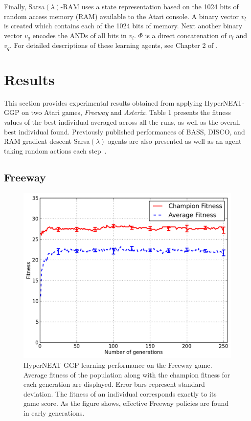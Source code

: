 \documentclass{sig-alternate}
\begin{document}
Finally, Sarsa$(\lambda)$-RAM uses a state representation based on the 1024 bits of random access memory (RAM) available to the Atari console. A binary vector $v_l$ is created which contains each of the 1024 bits of memory. Next another binary vector $v_q$ encodes the ANDs of all bits in $v_l$. $\Phi$ is a direct concatenation of $v_l$ and $v_q$. For detailed descriptions of these learning agents, see Chapter 2 of \cite{naddaf10}.

\section{Results}
\label{sec:results}
This section provides experimental results obtained from applying HyperNEAT-GGP on two Atari games, \textit{Freeway} and \textit{Asterix}. Table 1 presents the fitness values of the best individual averaged across all the runs, as well as the overall best individual found. Previously published performances of BASS, DISCO, and RAM gradient descent Sarsa$(\lambda)$ agents are also presented as well as an agent taking random actions each step~\cite{naddaf10}. 

\subsection {Freeway}

\begin{figure}[ht]
\begin{center}
\includegraphics[width=\columnwidth]{figures/freeway-results}
\end{center}
\caption{HyperNEAT-GGP learning performance on the Freeway game. Average fitness of the population along with the champion fitness for each generation are displayed. Error bars represent standard deviation. The fitness of an individual corresponds exactly to its game score. As the figure shows, effective Freeway policies are found in early generations.}
\label{fig:freeway-curve}
\end{figure}
\end{document}
